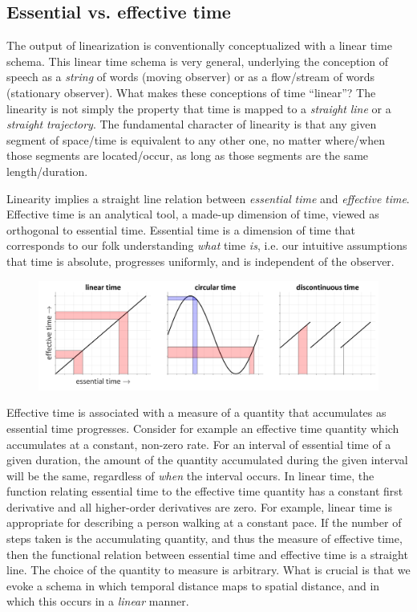 \subsection{Essential vs. effective time}

The output of linearization is conventionally conceptualized with a linear time schema. This linear time schema is very general, underlying the conception of speech as a \textit{string} of words (moving observer) or as a flow/stream of words (stationary observer). What makes these conceptions of time “linear”?  The linearity is not simply the property that time is mapped to a \textit{straight} \textit{line} or a \textit{straight} \textit{trajectory}. The fundamental character of linearity is that any given segment of space/time is equivalent to any other one, no matter where/when those segments are located/occur, as long as those segments are the same length/duration. 

  Linearity implies a straight line relation between \textit{essential} \textit{time} and \textit{effective} \textit{time}. Effective time is an analytical tool, a made-up dimension of time, viewed as orthogonal to essential time. Essential time is a dimension of time that corresponds to our folk understanding \textit{what} time \textit{is}, i.e. our intuitive assumptions that time is absolute, progresses uniformly, and is independent of the observer.

  
\begin{figure}
\includegraphics[width=\textwidth]{figures/Tilsen-img45.png}
\caption{\missingcaption}
\label{fig:}
\end{figure}
 

  Effective time is associated with a measure of a quantity that accumulates as essential time progresses. Consider for example an effective time quantity which accumulates at a constant, non-zero rate. For an interval of essential time of a given duration, the amount of the quantity accumulated during the given interval will be the same, regardless of \textit{when} the interval occurs. In linear time, the function relating essential time to the effective time quantity has a constant first derivative and all higher-order derivatives are zero. For example, linear time is appropriate for describing a person walking at a constant pace. If the number of steps taken is the accumulating quantity, and thus the measure of effective time, then the functional relation between essential time and effective time is a straight line. The choice of the quantity to measure is arbitrary. What is crucial is that we evoke a schema in which temporal distance maps to spatial distance, and in which this occurs in a \textit{linear} manner.

